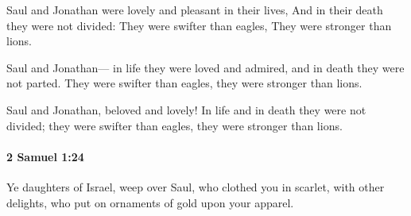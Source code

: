 			\begin{versebox}
					\item[BHS] 
					\item[ASV] Saul and Jonathan were lovely and pleasant in their lives, And in their death they were not divided: They were swifter than eagles, They were stronger than lions.
					\item[NIV] Saul and Jonathan— in life they were loved and admired, and in death they were not parted. They were swifter than eagles, they were stronger than lions.
					\item[NRSV] Saul and Jonathan, beloved and lovely! In life and in death they were not divided; they were swifter than eagles, they were stronger than lions.
			\end{versebox}

		\paragraph{2 Samuel 1:24} %
			\label{2SAMUEL-1-24}

			Ye daughters of Israel, weep over Saul, who clothed you in scarlet, with other delights, who put on ornaments of gold upon your apparel.

